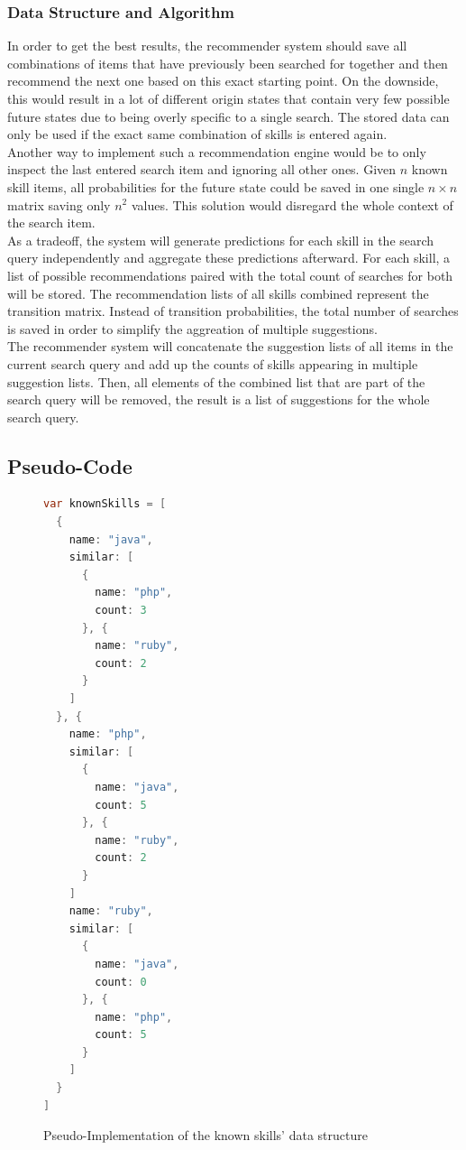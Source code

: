 \subsubsection{Data Structure and Algorithm}
In order to get the best results, the recommender system should save all combinations of items that have previously been searched for together and then recommend
the next one based on this exact starting point. On the downside, this would result in a lot of different origin states that contain very few possible future states due to being overly specific to a single search. The stored data can only be used if the exact same combination of skills is entered again.\\
Another way to implement such a recommendation engine would be to only inspect the last entered search item and ignoring all other ones. Given $n$ known skill items, all probabilities for the future state could be saved in one single $n \times n$ matrix saving only $n^2$ values.
This solution would disregard the whole context of the search item.\\
As a tradeoff, the system will generate predictions for each skill in the search query independently and aggregate these predictions afterward. For each skill, a list of possible recommendations paired with the total count of searches for both will be stored. The recommendation lists of all skills combined represent the transition matrix. Instead of transition probabilities, the total number of searches is saved in order to simplify the aggreation of multiple suggestions.\\
The recommender system will concatenate the suggestion lists of all items in the current search query and add up the counts of skills appearing in multiple suggestion lists. Then, all elements of the combined list that are part of the search query will be removed, the result is a list of suggestions for the whole search query.\\

\newpage
\subsection{Pseudo-Code}
\begin{figure}[h]
\begin{lstlisting}[language=Java]
var knownSkills = [
  {
    name: "java",
    similar: [
      {
        name: "php",
        count: 3
      }, {
        name: "ruby",
        count: 2
      }
    ]
  }, {
    name: "php",
    similar: [
      {
        name: "java",
        count: 5
      }, {
        name: "ruby",
        count: 2
      }
    ]
    name: "ruby",
    similar: [
      {
        name: "java",
        count: 0
      }, {
        name: "php",
        count: 5
      }
    ]
  }
]
\end{lstlisting}
\caption[Data Structure: Known Skill]{Pseudo-Implementation of the known skills' data structure}
\end{figure}

